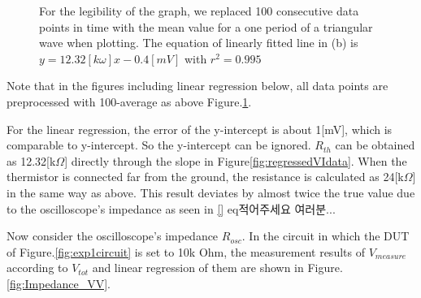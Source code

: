 \documentclass[5p,sort&compress]{elsarticle}
\begin{document}
\begin{figure}[h]
\centering
{}
\caption{
For the legibility of the graph, we replaced 100 consecutive data points in time with the mean value for a one period of a triangular wave when plotting. The equation of linearly fitted line in (b) is $y = 12.32[k\omega]x - 0.4[mV]$ with $r^2 = 0.995$} 

\label{fig:VVcurve}
\end{figure}

Note that in the figures including linear regression below, all data points are preprocessed with 100-average as above Figure.\ref{fig:VVcurve}.

For the linear regression, the error of the y-intercept is about 1[mV], which is comparable to y-intercept. So the y-intercept can be ignored.
$R_{th}$ can be obtained as 12.32[k$\Omega$] directly through the slope in Figure\ref{fig:regressedVIdata}.
\newline{}
When the thermistor is connected far from the ground, the resistance is calculated as 24[k$\Omega$] in the same way as above. This result deviates by almost twice the true value due to the oscilloscope's impedance as seen in \ref{} eq적어주세요 여러분...

Now consider the oscilloscope's impedance $R_{osc}$. In the circuit in which the DUT of Figure.\ref{fig:exp1circuit} is set to 10k Ohm, the measurement results of $V_{measure}$ according to $V_{tot}$ and linear regression of them are shown in Figure.\ref{fig:Impedance_VV}.
\end{document}
